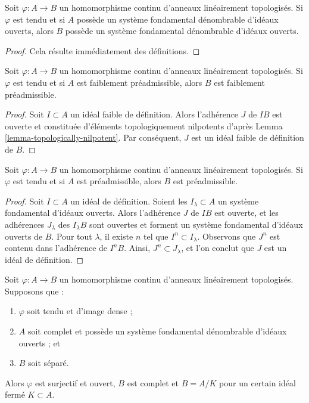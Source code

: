 \begin{lemma}
\label{lemma-taut-ascent-countable}
Soit $\varphi : A \to B$ un homomorphisme continu d'anneaux
linéairement topologisés. Si $\varphi$ est tendu et si $A$
possède un système fondamental dénombrable d'idéaux ouverts, alors
$B$ possède un système fondamental dénombrable d'idéaux ouverts.
\end{lemma}

\begin{proof}
Cela résulte immédiatement des définitions.
\end{proof}

\begin{lemma}
\label{lemma-taut-ascent-weakly-admissible}
Soit $\varphi : A \to B$ un homomorphisme continu d'anneaux
linéairement topologisés. Si $\varphi$ est tendu et si $A$
est faiblement préadmissible, alors $B$ est faiblement préadmissible.
\end{lemma}

\begin{proof}
Soit $I \subset A$ un idéal faible de définition. Alors l'adhérence
$J$ de $IB$ est ouverte et constituée d'éléments topologiquement nilpotents
d'après Lemma \ref{lemma-topologically-nilpotent}. Par conséquent, $J$ est un idéal faible
de définition de $B$.
\end{proof}

\begin{lemma}
\label{lemma-taut-ascent-admissible}
Soit $\varphi : A \to B$ un homomorphisme continu d'anneaux
linéairement topologisés. Si $\varphi$ est tendu et si $A$
est préadmissible, alors $B$ est préadmissible.
\end{lemma}

\begin{proof}
Soit $I \subset A$ un idéal de définition. Soient
les $I_\lambda \subset A$ un système fondamental d'idéaux ouverts.
Alors l'adhérence $J$ de $IB$ est ouverte, et les
adhérences $J_\lambda$ des $I_\lambda B$ sont ouvertes et forment un
système fondamental d'idéaux ouverts de $B$.
Pour tout $\lambda$, il existe $n$ tel que $I^n \subset I_\lambda$.
Observons que $J^n$ est contenu dans l'adhérence de $I^nB$.
Ainsi, $J^n \subset J_\lambda$, et l'on conclut que $J$ est un
idéal de définition.
\end{proof}

\begin{lemma}
\label{lemma-dense-image-surjective}
Soit $\varphi : A \to B$ un homomorphisme continu d'anneaux
linéairement topologisés. Supposons que :
\begin{enumerate}
\item $\varphi$ soit tendu et d'image dense ;
\item $A$ soit complet et possède un système fondamental dénombrable
d'idéaux ouverts ; et
\item $B$ soit séparé.
\end{enumerate}
Alors $\varphi$ est surjectif et ouvert, $B$ est complet et $B = A/K$ pour
un certain idéal fermé $K \subset A$.
\end{lemma}


